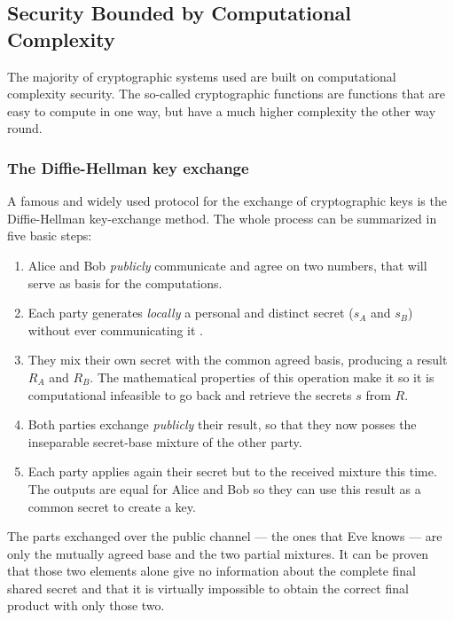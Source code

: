 	\subsection{Security Bounded by Computational Complexity}
	The majority of cryptographic systems used are built on computational complexity security. The so-called cryptographic functions are functions that are easy to compute in one way, but have a much higher complexity the other way round.
		\subsubsection{The Diffie-Hellman key exchange}
	
		A famous and widely used protocol for the exchange of cryptographic keys is the Diffie-Hellman key-exchange method.
	The whole process can be summarized in five basic steps:
	\begin{enumerate}
		\item Alice and Bob \emph{publicly} communicate and agree on two numbers, that will serve as basis for the computations.
		\item Each party generates \emph{locally} a personal and distinct secret ($s_A$ and $s_B$) without ever communicating it .
		\item They mix their own secret with the common agreed basis, producing a result $R_A$ and $R_B$. The mathematical properties of this operation make it so it is computational infeasible to go back and retrieve the secrets $s$ from $R$.
		\item Both parties exchange \emph{publicly} their result, so that they now posses the inseparable secret-base mixture of the other party.
		\item Each party applies again their secret but to the received mixture this time. The outputs are equal for Alice and Bob so they can use this result as a common secret to create a key.
	\end{enumerate}	 
	The parts exchanged over the public channel --- the ones that Eve knows --- are only the mutually agreed base and the two partial mixtures. 
	It can be proven that those two elements alone give no information about the complete final shared secret and that it is virtually impossible to obtain the correct final product with only those two.\\  
	
